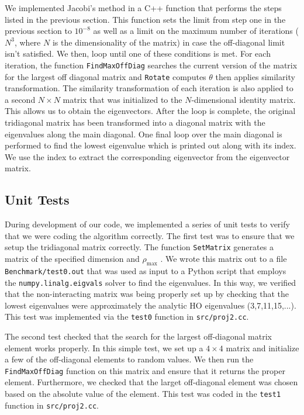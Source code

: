 \documentclass[10pt,showpacs,preprintnumbers,footinbib,amsmath,amssymb,aps,prl,twocolumn,groupedaddress,superscriptaddress,showkeys]{revtex4-1}
\newcommand{\pwrten}[1]{%
	\ensuremath{10^{#1}} }
\newcommand{\rhomax}{
	\ensuremath{ \rho _{\mathrm{max}}} }
\begin{document}
{We implemented Jacobi's method in a C++ function that performs the steps listed
in the previous section. This function sets the limit from step one in the previous
section to \pwrten{-8} as well as a limit on the maximum number of iterations ($N^3$,
where $N$ is the dimensionality of the matrix) in case the off-diagonal limit
isn't satisfied. We then, loop until one of these conditions is met. For each iteration,
the function \texttt{FindMaxOffDiag} searches the current version of the matrix for
the largest off diagonal matrix and \texttt{Rotate} computes $\theta$ then applies
similarity transformation. The similarity transformation of each iteration is also applied
to a second $N \times N$ matrix that was initialized to the $N$-dimensional identity
matrix. This allows us to
obtain the eigenvectors. After the loop is complete, the original tridiagonal matrix
has been transformed into a diagonal matrix with the eigenvalues along the main
diagonal. One final loop over the main diagonal is performed to find the lowest
eigenvalue which is printed out along with its index. We use the index to extract
the corresponding eigenvector from the eigenvector matrix.


 
\subsection{Unit Tests}
During development of our code, we implemented a series of unit tests to verify that
we were coding the algorithm correctly. The first test was to ensure that we setup
the tridiagonal matrix correctly. The function \texttt{SetMatrix} generates a matrix
of the specified dimension and \rhomax. We wrote this matrix out to a file
\texttt{Benchmark/test0.out} that was used as input to a Python script that employs
the \texttt{numpy.linalg.eigvals} solver to find the eigenvalues. In this way, we verified
that the non-interacting matrix was being properly set up by checking that the lowest
eigenvalues were approximately the analytic HO eigenvalues (3,7,11,15,...). This test
was implemented via the \texttt{test0} function in \texttt{src/proj2.cc}.

The second test checked that the search for the largest off-diagonal matrix element
works properly. In this simple test, we set up a $4 \times 4$ matrix and initialize a
few of the off-diagonal elements to random values. We then run the \texttt{FindMaxOffDiag}
function on this matrix and ensure that it returns the proper element. Furthermore, we
checked that the larget off-diagonal element was chosen based on the absolute value
of the element. This test was coded in the \texttt{test1} function in \texttt{src/proj2.cc}.

}
\end{document}

